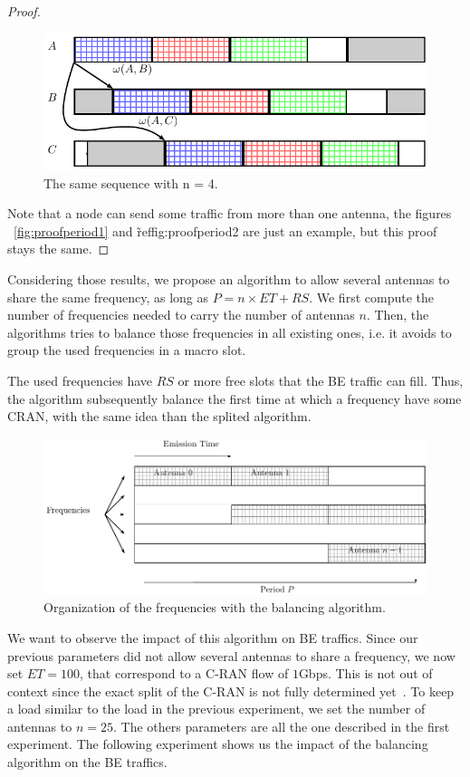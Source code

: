 \documentclass[a4paper,10pt,french,english]{article}
\begin{document}
\begin{proof}
   \begin{figure}[h]
\centering
      \includegraphics[scale=0.7]{period2.pdf}
     \caption{The same sequence with n = 4.}   \label{fig:proofperiod2}
  \end{figure}
  Note that a node can send some traffic from more than one antenna, the figures ~\ref{fig:proofperiod1} and \~ref{fig:proofperiod2} are just an example, but this proof stays the same.
 \end{proof}
 
Considering those results, we propose an algorithm to allow several antennas to share the same frequency, as long as $P = n\times ET + RS$. 
We first compute the number of frequencies needed to carry the number of antennas $n$. Then, the algorithms tries to balance those frequencies in all existing ones, i.e. it avoids to group the used frequencies in a macro slot.

The used frequencies have $RS$ or more free slots that the BE traffic can fill. Thus, the algorithm subsequently balance the first time at which a frequency have some CRAN, with the same idea than the splited algorithm.

   \begin{figure}[h]
\centering
      \includegraphics[scale=0.7]{optimalgo.pdf}
     \caption{Organization of the frequencies with the balancing algorithm.}   \label{fig:optimalgo}
  \end{figure}
  
  We want to observe the impact of this algorithm on BE traffics. Since our previous parameters did not allow several antennas to share a frequency, we now set $ET = 100$, that correspond to a C-RAN flow of $1$Gbps. This is not out of context since the exact split of the C-RAN is not fully determined yet~\cite{REF}. To keep a load similar to the load in the previous experiment, we set the number of antennas to $n=25$. The others parameters are all the one described in the first experiment.
  The following experiment shows us the impact of the balancing algorithm on the BE traffics.
  
\end{document}
